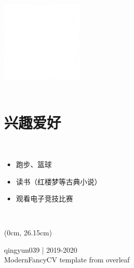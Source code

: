 \documentclass[a4paper]{friggeri-cv_reccius-experiment}
\begin{document}
\begin{aside}
    \includegraphics[scale=0.11]{img/WhiteDots.png}\\~
  
  \vspace{-2.7mm}
  \section{兴趣爱好}\\
  \vspace{3.5mm}
  \begin{itemize}[leftmargin=*, noitemsep]
      \item 跑步、篮球
      \item 读书（红楼梦等古典小说）
      \item 观看电子竞技比赛
  \end{itemize}
  
\end{aside}
~
\newcommand{\belowspace}{\vspace*{0.85mm}}
\begin{textblock*}{\paperwidth}(0cm, 26.15cm)
  \begin{center}
      qingyun039 | 2019-2020\\
      ModernFancyCV template from overleaf
  \end{center}
\end{textblock*}

\newcommand{\eduspace}{\vspace*{0.85mm}}
\newcommand{\eduspaceII}{\vspace*{0.8mm}}
\newcommand{\jobspace}{\vspace*{-4.2mm}}
\vspace{-0.5mm}
\end{document}
